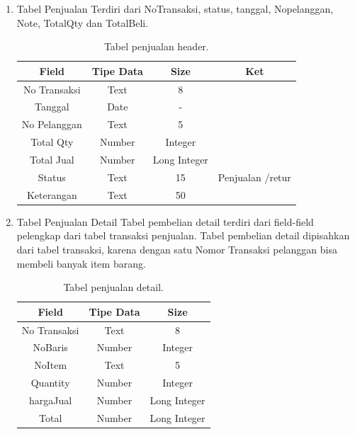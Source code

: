 \documentclass{article}
\begin{document}
\begin{enumerate}
    \item Tabel Penjualan \newline
    Terdiri dari NoTransaksi, status, tanggal, Nopelanggan, Note, TotalQty dan TotalBeli. 
\begin{table}[h!]
\centering
\begin{tabular}{||c c c c ||} 
 \hline
 Field & Tipe Data & Size & Ket \\ [0.5ex] 
 \hline\hline
No Transaksi & Text  & 8 & \\
Tanggal & Date & -  & \\	
No Pelanggan & Text & 5 & \\	
Total Qty & Number & Integer &  \\		
Total Jual & Number & Long Integer  & \\		
Status & Text & 15 & Penjualan /retur \\
Keterangan & Text & 50 &  \\ [1ex]
 \hline
\end{tabular}
\caption{Tabel penjualan header.}
\label{table:6}
\end{table}
\newpage
    \item Tabel Penjualan Detail \newline
    Tabel pembelian detail terdiri dari field-field pelengkap dari tabel transaksi penjualan. Tabel pembelian detail dipisahkan dari tabel transaksi, karena dengan satu Nomor Transaksi pelanggan bisa membeli banyak item barang.
     \begin{table}[h!]
    \centering
    \begin{tabular}{||c c c ||} 
     \hline
     Field & Tipe Data & Size \\ [0.5ex] 
     \hline\hline
No Transaksi & Text & 8 \\
NoBaris & Number & Integer \\
NoItem & Text & 5 \\ 
Quantity & Number & Integer \\
hargaJual & Number & Long Integer \\
Total & Number & Long Integer \\ [1ex]
     \hline
    \end{tabular}
    \caption{Tabel penjualan detail.}
    \label{table:7}
    \end{table}


\end{enumerate}
\end{document}

